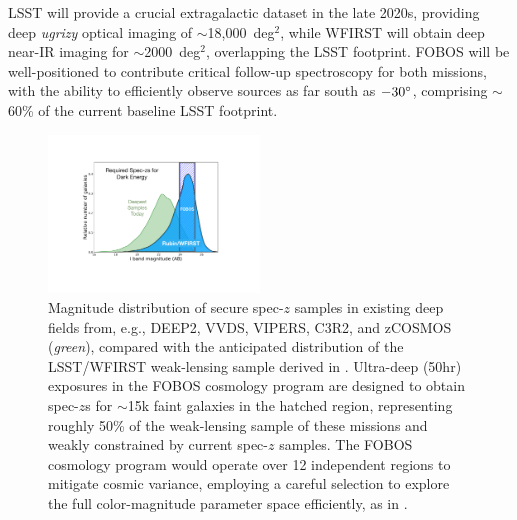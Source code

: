 \documentclass[oneside,11pt]{amsart}
\begin{document}

LSST will provide a crucial extragalactic dataset in the late 2020s, providing deep \textit{ugrizy} optical imaging of $\sim$18,000~deg$^{2}$, while WFIRST will obtain deep near-IR imaging for $\sim$2000~deg$^{2}$, overlapping the LSST footprint. FOBOS will be well-positioned to contribute critical follow-up spectroscopy for both missions, with the ability to efficiently observe sources as far south as $-30\degree$, comprising $\sim$60\% of the current baseline LSST footprint.

\begin{figure}%
\vspace{-0.2cm}
\includegraphics[width=0.5\textwidth]{figs/fobos_cosmology_v2.pdf}
\caption{\footnotesize Magnitude distribution of secure spec-$z$ samples in existing deep fields from, e.g., DEEP2, VVDS, VIPERS, C3R2, and zCOSMOS ({\it green}), compared with the anticipated distribution of the LSST/WFIRST weak-lensing sample derived in \citet[][{\it blue}]{hemmati18}. Ultra-deep (50hr) exposures in the FOBOS cosmology program are designed to obtain spec-$z$s for $\sim$15k faint galaxies in the hatched region, representing roughly 50\% of the weak-lensing sample of these missions and weakly constrained by current spec-$z$ samples. The FOBOS cosmology program would operate over 12 independent regions to mitigate cosmic variance, employing a careful selection to explore the full color-magnitude parameter space efficiently, as in \cite{masters15}. }
\label{fig:cosmos_magdist}
\end{figure}
\end{document}
